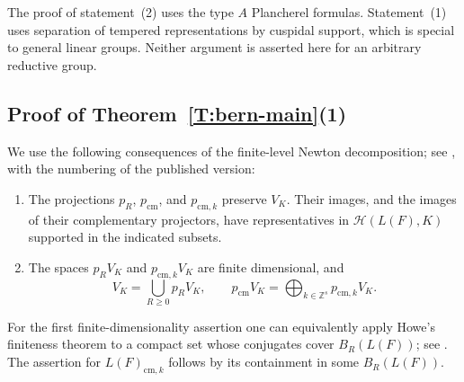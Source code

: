 \documentclass[11pt,a4paper]{amsart}
\newcommand{\mcH}{\mathcal H}
\theoremstyle{definition}
\theoremstyle{remark}
\begin{document}
The proof of statement~(2) uses the type $A$ Plancherel formulas.
Statement~(1) uses separation of tempered representations by cuspidal
support, which is special to general linear groups. Neither argument
is asserted here for an arbitrary reductive group.
\subsection{Proof of Theorem~\ref{T:bern-main}\label{SS:bern-finite-level}(1)}

We use the following consequences of the finite-level Newton
decomposition; see \cite[Theorem 11 and Corollary 9]{He},
with the numbering of the published version:
\begin{enumerate}
\item The projections $p_R$, $p_{\mathrm{cm}}$, and
$p_{\mathrm{cm},k}$ preserve $V_K$. Their images, and the images of
their complementary projectors, have representatives in
$\mcH(L(F),K)$ supported in the indicated subsets.
\item The spaces $p_RV_K$ and $p_{\mathrm{cm},k}V_K$ are finite
dimensional, and
$$
 V_K=\bigcup_{R\geq0}p_RV_K,
 \qquad
 p_{\mathrm{cm}}V_K=\bigoplus_{k\in\mathbb Z^s}p_{\mathrm{cm},k}V_K.
$$
\end{enumerate}
For the first finite-dimensionality assertion one can equivalently
apply Howe's finiteness theorem to a compact set whose conjugates
cover $B_R(L(F))$; see \cite[Theorem 18]{He}. The assertion for
$L(F)_{\mathrm{cm},k}$ follows by its containment in some $B_R(L(F))$.
\end{document}
